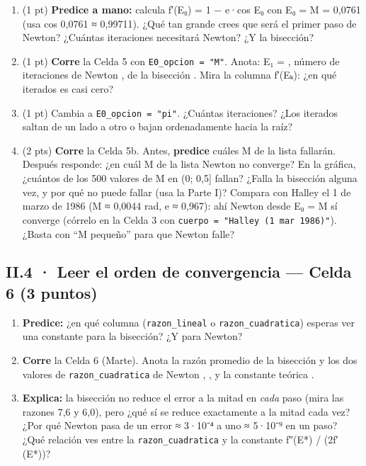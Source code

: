 \begin{enumerate}
\def\labelenumi{\alph{enumi})}
\item
  (1 pt) \textbf{Predice a mano:} calcula f′(E₀) = 1 − e·cos E₀ con E₀ = M = 0,0761 (usa cos 0,0761 ≈ 0,99711). ¿Qué tan grande crees que será el primer paso de Newton? ¿Cuántas iteraciones necesitará Newton? ¿Y la bisección?
\item
  (1 pt) \textbf{Corre} la Celda 5 con \texttt{E0\_opcion\ =\ "M"}. Anota: E₁ =  , número de iteraciones de Newton  , de la bisección  . Mira la columna f′(Eₖ): ¿en qué iterados es casi cero?
\item
  (1 pt) Cambia a \texttt{E0\_opcion\ =\ "pi"}. ¿Cuántas iteraciones? ¿Los iterados saltan de un lado a otro o bajan ordenadamente hacia la raíz?
\item
  (2 pts) \textbf{Corre} la Celda 5b. Antes, \textbf{predice} cuáles M de la lista fallarán. Después responde: ¿en cuál M de la lista Newton no converge? En la gráfica, ¿cuántos de los 500 valores de M en (0; 0,5{]} fallan? ¿Falla la bisección alguna vez, y por qué no puede fallar (usa la Parte I)? Compara con Halley el 1 de marzo de 1986 (M ≈ 0,0044 rad, e ≈ 0,967): ahí Newton desde E₀ = M sí converge (córrelo en la Celda 3 con \texttt{cuerpo\ =\ "Halley\ (1\ mar\ 1986)"}). ¿Basta con ``M pequeño'' para que Newton falle?
\end{enumerate}

\subsection{II.4 · Leer el orden de convergencia --- Celda 6 (3 puntos)}

\begin{enumerate}
\def\labelenumi{\alph{enumi})}
\item
  \textbf{Predice:} ¿en qué columna (\texttt{razon\_lineal} o \texttt{razon\_cuadratica}) esperas ver una constante para la bisección? ¿Y para Newton?
\item
  \textbf{Corre} la Celda 6 (Marte). Anota la razón promedio de la bisección  y los dos valores de \texttt{razon\_cuadratica} de Newton  ,  , y la constante teórica  .
\item
  \textbf{Explica:} la bisección no reduce el error a la mitad en \emph{cada} paso (mira las razones 7,6 y 6,0), pero ¿qué sí se reduce exactamente a la mitad cada vez? ¿Por qué Newton pasa de un error ≈ 3·10⁻⁴ a uno ≈ 5·10⁻⁹ en un paso? ¿Qué relación ves entre la \texttt{razon\_cuadratica} y la constante \textbar f″(E*)\textbar{} / (2\textbar f′(E*)\textbar)?
\end{enumerate}

